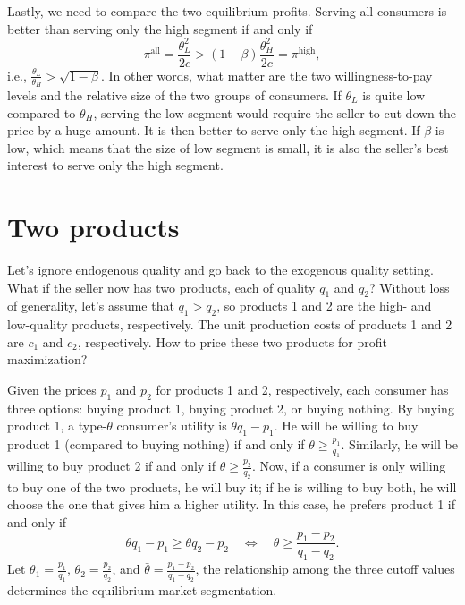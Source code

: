 \documentclass[12pt,a4paper]{article}
\begin{document}
Lastly, we need to compare the two equilibrium profits. 
Serving all consumers is better than serving only the high segment 
if and only if 
\[
	\pi^{\mathrm{all}} = \frac{\theta_L^2}{2c} 
	> (1 - \beta) \frac{\theta_H^2}{2c} = \pi^{\mathrm{high}}, 
\]
i.e., $\frac{\theta_L}{\theta_H} > \sqrt{1 - \beta}$. 
In other words, what matter are the two willingness-to-pay levels and 
the relative size of the two groups of consumers. If $\theta_L$ is quite low
compared to $\theta_H$, serving the low segment would require the seller
to cut down the price by a huge amount. It is then better to serve only 
the high segment. If $\beta$ is low, which means that 
the size of low segment is small, it is also the seller's best interest to 
serve only the high segment. 











\section{Two products}

Let's ignore endogenous quality and go back to the exogenous quality setting. 
What if the seller now has two products, each of quality $q_1$ and $q_2$? 
Without loss of generality, let's assume that $q_1 > q_2$, 
so products 1 and 2 are the high- and low-quality products, respectively. 
The unit production costs of products 1 and 2 are $c_1$ and $c_2$, respectively. 
How to price these two products for profit maximization? 

Given the prices $p_1$ and $p_2$ for products 1 and 2, respectively, 
each consumer has three options: buying product 1, buying product 2, 
or buying nothing. By buying product 1, a type-$\theta$ consumer's utility 
is $\theta q_1 - p_1$. He will be willing to buy product 1 (compared to 
buying nothing) if and only if $\theta \geq \frac{p_1}{q_1}$. 
Similarly, he will be willing to buy product 2 if and only if 
$\theta \geq \frac{p_2}{q_2}$. Now, if a consumer is only willing to buy
one of the two products, he will buy it; if he is willing to buy both, 
he will choose the one that gives him a higher utility. 
In this case, he prefers product 1 if and only if 
\[
	\theta q_1 - p_1 \geq \theta q_2 - p_2 \quad\Leftrightarrow\quad
	\theta \geq \frac{p_1 - p_2}{q_1 - q_2}. 
\]
Let $\theta_1 = \frac{p_1}{q_1}$, $\theta_2 = \frac{p_2}{q_2}$, 
and $\bar{\theta} = \frac{p_1 - p_2}{q_1 - q_2}$, the relationship
among the three cutoff values determines the equilibrium market segmentation. 
\end{document}

